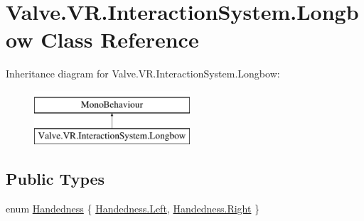 \hypertarget{class_valve_1_1_v_r_1_1_interaction_system_1_1_longbow}{}\section{Valve.\+V\+R.\+Interaction\+System.\+Longbow Class Reference}
\label{class_valve_1_1_v_r_1_1_interaction_system_1_1_longbow}
Inheritance diagram for Valve.\+V\+R.\+Interaction\+System.\+Longbow\+:\begin{figure}[H]
\begin{center}
\leavevmode
\includegraphics[height=2.000000cm]{class_valve_1_1_v_r_1_1_interaction_system_1_1_longbow}
\end{center}
\end{figure}
\subsection*{Public Types}
\begin{DoxyCompactItemize}
\item 
enum \mbox{\hyperlink{class_valve_1_1_v_r_1_1_interaction_system_1_1_longbow_a1a13793c73b85cc47cc323af991169be}{Handedness}} \{ \mbox{\hyperlink{class_valve_1_1_v_r_1_1_interaction_system_1_1_longbow_a1a13793c73b85cc47cc323af991169bea945d5e233cf7d6240f6b783b36a374ff}{Handedness.\+Left}}, 
\mbox{\hyperlink{class_valve_1_1_v_r_1_1_interaction_system_1_1_longbow_a1a13793c73b85cc47cc323af991169bea92b09c7c48c520c3c55e497875da437c}{Handedness.\+Right}}
 \}
\end{DoxyCompactItemize}
